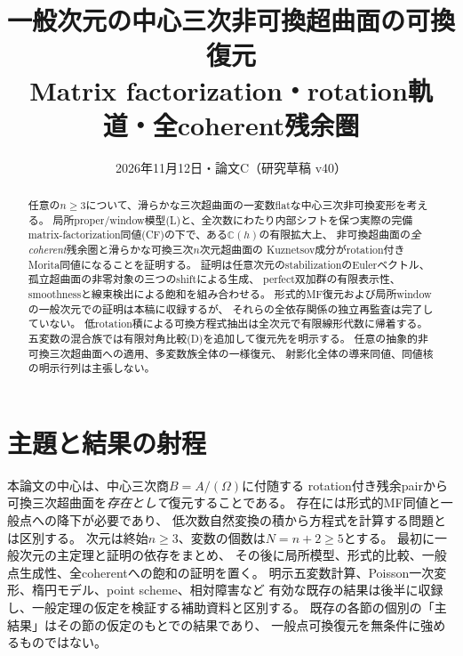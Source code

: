 \makeatletter
{}
\makeatother

\title{一般次元の中心三次非可換超曲面の可換復元\\
\large Matrix factorization・rotation軌道・全coherent残余圏}
\author{}
\date{2026年11月12日・論文C（研究草稿 v40）}

\maketitle
\begin{abstract}
任意の$n\ge3$について、滑らかな三次超曲面の一変数flatな中心三次非可換変形を考える。
局所proper/window模型(L)と、全次数にわたり内部シフトを保つ実際の完備
matrix-factorization同値(CF)の下で、ある$\mathbb C(h)$の有限拡大上、
非可換超曲面の\emph{全coherent}残余圏と滑らかな可換三次$n$次元超曲面の
Kuznetsov成分がrotation付きMorita同値になることを証明する。
証明は任意次元のstabilizationのEulerベクトル、
孤立超曲面の非零対象の三つのshiftによる生成、
perfect双加群の有限表示性、smoothnessと線束検出による飽和を組み合わせる。
形式的MF復元および局所windowの一般次元での証明は本稿に収録するが、
それらの全依存関係の独立再監査は完了していない。
低rotation積による可換方程式抽出は全次元で有限線形代数に帰着する。
五変数の混合族では有限対角比較(D)を追加して復元先を明示する。
任意の抽象的非可換三次超曲面への適用、多変数族全体の一様復元、
射影化全体の導来同値、同値核の明示行列は主張しない。
\end{abstract}
\tableofcontents

\section*{主題と結果の射程}
本論文の中心は、中心三次商$B=A/(\Omega)$に付随する
rotation付き残余pairから可換三次超曲面を\emph{存在として}復元することである。
存在には形式的MF同値と一般点への降下が必要であり、
低次数自然変換の積から方程式を計算する問題とは区別する。
次元は終始$n\ge3$、変数の個数は$N=n+2\ge5$とする。
最初に一般次元の主定理と証明の依存をまとめ、
その後に局所模型、形式的比較、一般点生成性、全coherentへの飽和の証明を置く。
明示五変数計算、Poisson一次変形、楕円モデル、point scheme、相対障害など
有効な既存の結果は後半に収録し、一般定理の仮定を検証する補助資料と区別する。
既存の各節の個別の「主結果」はその節の仮定のもとでの結果であり、
一般点可換復元を無条件に強めるものではない。

